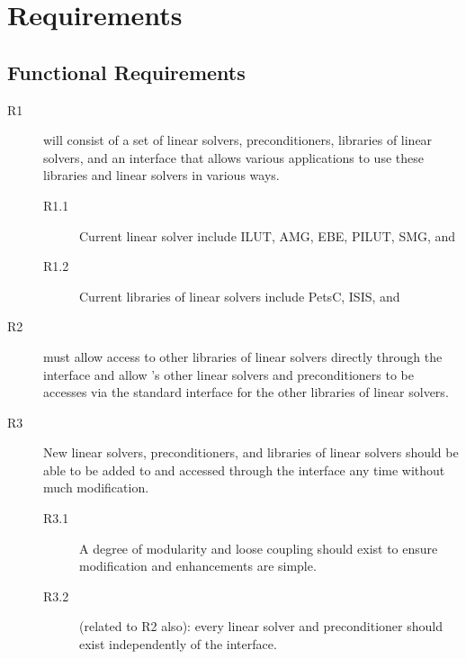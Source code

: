 \chapter{\hypre{} Requirements}
\label{hypre Requirements}

\section{Functional Requirements}
\label{Functional Requirements}

\begin{description}

\item[R1] \hypre{} will consist of a set of linear solvers,
preconditioners, libraries of linear solvers, and an interface that
allows various applications to use these libraries and linear solvers
in various ways.
\begin{description}

\item[R1.1] Current linear solver include ILUT, AMG, EBE, PILUT, SMG,
and

\item[R1.2] Current libraries of linear solvers include PetsC, ISIS, and

\end{description}

\item[R2] \hypre{} must allow access to other libraries of linear
solvers directly through the \hypre{} interface and allow \hypre{}'s other
linear solvers and preconditioners to be accesses via the standard
interface for the other libraries of linear solvers.


\item[R3] New linear solvers, preconditioners, and libraries of
linear solvers should be able to be added to \hypre{} and accessed
through the \hypre{} interface any time without much modification.
\begin{description}

\item[R3.1] A degree of modularity and loose coupling should exist to
ensure modification and enhancements are simple.

\item[R3.2] (related to R2 also): every linear solver and
preconditioner should exist independently of the \hypre{} interface.


\end{description}
\end{description}

